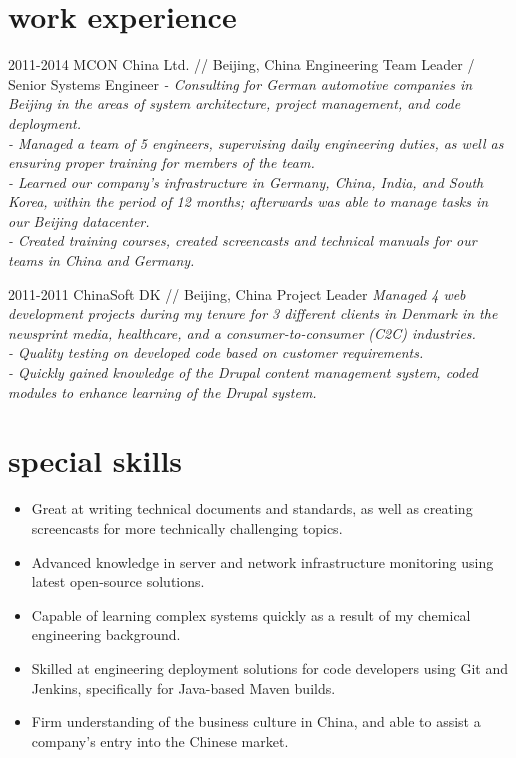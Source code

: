 \documentclass[]{friggeri-cv}
\begin{document}
\section{work experience}

\begin{entrylist}

  \entry
    {2011-2014}
    {MCON China Ltd. // Beijing, China}
    {Engineering Team Leader / Senior Systems Engineer}
    {\emph{- Consulting for German automotive companies in Beijing in the areas of system architecture, project management, and code deployment.\\
    - Managed a team of 5 engineers, supervising daily engineering duties, as well as ensuring proper training for members of the team.\\
    - Learned our company’s infrastructure in Germany, China, India, and South Korea, within the period of 12 months; afterwards was able to manage tasks in our Beijing datacenter.\\
    - Created training courses, created screencasts and technical manuals for our teams in China and Germany.}}

  \entry
    {2011-2011}
    {ChinaSoft DK // Beijing, China}
    {Project Leader}
    {\emph{Managed 4 web development projects during my tenure for 3 different clients in Denmark in the newsprint media, healthcare, and a consumer-to-consumer (C2C) industries.\\
    - Quality testing on developed code based on customer requirements.\\
    - Quickly gained knowledge of the Drupal content management system, coded modules to enhance learning of the Drupal system.}}

\end{entrylist}

\section{special skills}

\begin{itemize}
\item
Great at writing technical documents and standards, as well as creating screencasts for more technically challenging topics.
\item
Advanced knowledge in server and network infrastructure monitoring using latest open-source solutions.
\item
Capable of learning complex systems quickly as a result of my chemical engineering background.
\item
Skilled at engineering deployment solutions for code developers using Git and Jenkins, specifically for Java-based Maven builds.
\item
Firm understanding of the business culture in China, and able to assist a company’s entry into the Chinese market.
\end{itemize}
\end{document}
